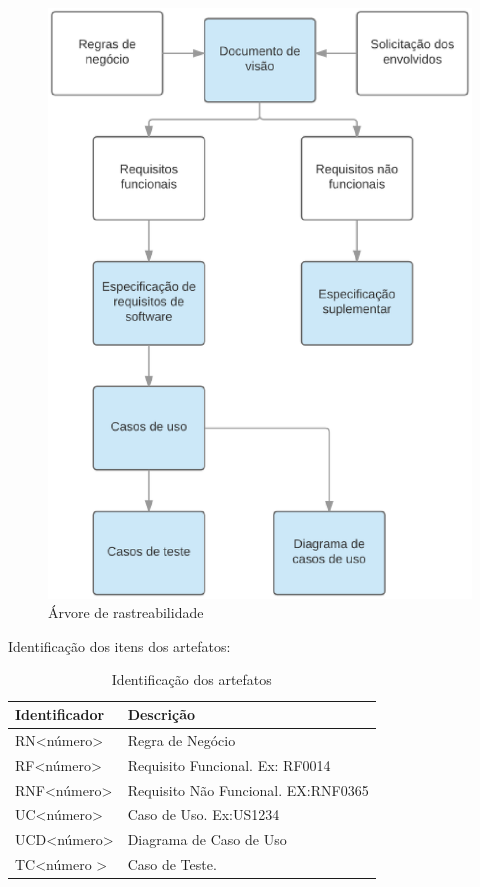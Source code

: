 \begin{figure}[htb]
\centering
  \includegraphics[keepaspectratio=true,scale=0.7]
  {figuras/arvore_rastreabilidade.eps}
  \caption{Árvore de rastreabilidade}
  \label{matrix_requirement}
\end{figure}

Identificação dos itens dos artefatos:

\begin{table}[]
\centering
\label{artefacts-identifier}
\begin{tabular}{|l|l|}
\hline
\textbf{Identificador}         & \textbf{Descrição}                  \\ \hline
RN\textless número\textgreater  & Regra de Negócio                    \\ \hline
RF\textless número\textgreater  & Requisito Funcional. Ex: RF0014     \\ \hline
RNF\textless número\textgreater & Requisito Não Funcional. EX:RNF0365 \\ \hline
UC\textless número\textgreater  & Caso de Uso. Ex:US1234              \\ \hline
UCD\textless número\textgreater & Diagrama de Caso de Uso             \\ \hline
TC\textless número \textgreater  & Caso de Teste.                     \\ \hline
\end{tabular}
\caption{Identificação dos artefatos}
\end{table}

